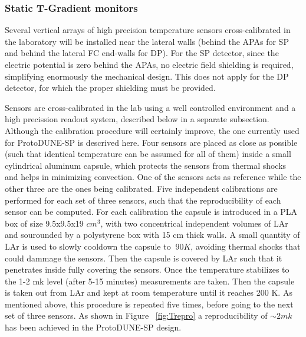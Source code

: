 \subsubsection{Static T-Gradient monitors}

Several vertical arrays of high precision temperature sensors cross-calibrated in the laboratory will be installed near the lateral walls
(behind the APAs for SP and behind the lateral FC end-walls for DP). 
For the SP detector, since the electric potential is zero behind the APAs, no electric field shielding is required, simplifying enormously the mechanical design.
This does not apply for the DP detector, for which the proper shielding must be provided. 


Sensors are cross-calibrated in the lab using a well controlled environment and a high precission readout system, described below in a separate subsection.
Although the calibration procedure will certainly improve, the one currently used for ProtoDUNE-SP is descrived here.
Four sensors are placed as close as possible (such that identical temperature can be assumed for all of them) inside a small cylindrical aluminum capsule,
which protects the sensors from thermal shocks and helps in minimizing convection.
One of the sensors acts as reference while the other three are the ones being calibrated. Five independent calibrations
are performed for each set of three sensors, such that the reproducibility of each sensor can be computed. For each calibration 
the capsule is introduced in a PLA box of size 9.5x9.5x19 $cm^3$, with two concentrical independent volumes of LAr
and sourounded by a polystyrene box with 15 cm thick walls. A small quantity of LAr is used to slowly cooldown the capsule to $~90 K$, avoiding thermal shocks that could dammage the sensors.
Then the capsule is covered by LAr such that it penetrates
inside fully covering the sensors. Once the temperature stabilizes to the 1-2 mk level (after 5-15 minutes) measurements are taken. Then the capsule is taken out from LAr
and kept at room temperature until it reaches 200 K. As mentioned above, this procedure is repeated five times, before going to the next set of three sensors.  
As shown in Figure ~\ref{fig:Trepro} a reproducibility of $\sim2 mk$ has been achieved in the ProtoDUNE-SP design.  

